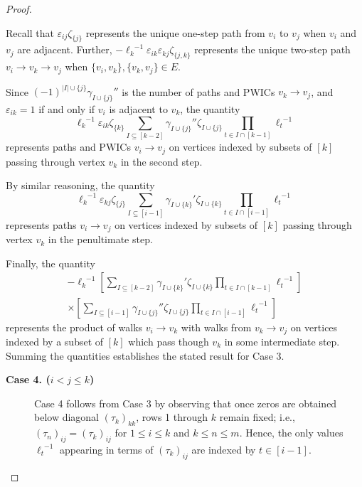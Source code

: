 \documentclass{article}
\theoremstyle{definition}
\numberwithin{equation}{section}
\begin{document}
\begin{proof}
\begin{description}
Recall that $\varepsilon_{ij}\zeta_{\{j\}}$ represents the unique one-step path from $v_i$ to $v_j$ when $v_i$ and $v_j$ are adjacent.  Further, $-{\ell_k}^{-1}\varepsilon_{ik}\varepsilon_{kj}\zeta_{\{j,k\}}$ represents the unique two-step path $v_i\to v_k\to v_j$ when $\{v_i,v_k\}, \{v_k,v_j\}\in E$.  

Since $(-1)^{|I|\cup\{j\}}{\gamma_{I\cup\{j\}}}''$ is the number of paths and PWICs $v_k\to v_j$, and $\varepsilon_{ik}=1$ if and only if $v_i$ is adjacent to $v_k$, the quantity \begin{equation*}
{\ell_k}^{-1}\varepsilon_{ik}\zeta_{\{k\}}\sum_{I\subseteq [k-2]}{\gamma_{I\cup\{j\}}}''\zeta_{I\cup\{j\}}\prod_{t\in I\cap[k-1]}{\ell_t}^{-1}
\end{equation*}
represents paths and PWICs $v_i\to v_j$ on vertices indexed by subsets of $[k]$ passing through vertex $v_k$ in the second step.

By similar reasoning, the quantity \begin{equation*}
{\ell_k}^{-1}\varepsilon_{kj}\zeta_{\{j\}}\sum_{I\subseteq [i-1]}{\gamma_{I\cup\{k\}}}'\zeta_{I\cup\{k\}}\prod_{t\in I\cap[i-1]}{\ell_t}^{-1}\end{equation*}
represents paths $v_i\to v_j$ on vertices indexed by subsets of $[k]$ passing through vertex $v_k$ in the penultimate step.

Finally, the quantity 
\begin{align*}
-{\ell_k}^{-1}\left[\sum_{I\subseteq [k-2]}{\gamma_{I\cup\{k\}}}'\zeta_{I\cup\{k\}}\prod_{t\in I\cap[k-1]}{\ell_t}^{-1}\right]\\
\times\left[\sum_{I\subseteq [i-1]}{\gamma_{I\cup\{j\}}}''\zeta_{I\cup\{j\}}\prod_{t\in I\cap[i-1]}{\ell_t}^{-1}\right]
\end{align*}
represents the product of walks $v_i\to v_k$ with walks from $v_k\to v_j$ on vertices indexed by a subset of $[k]$ which pass though $v_k$ in some intermediate step.  Summing the quantities establishes the stated result for Case 3.
\end{description}

\begin{description}
\item [{\bf Case 4. ($i<j\le k$)}]
Case 4 follows from Case 3 by observing that once zeros are obtained below diagonal $(\tau_k)_{kk}$, rows 1 through $k$ remain fixed; i.e., $(\tau_n)_{ij}=(\tau_k)_{ij}$ for $1\le i\le k$ and $k\le n\le m$.   Hence, the only values ${\ell_t}^{-1}$ appearing in terms of $(\tau_k)_{ij}$ are indexed by $t\in [i-1]$. 
\end{description}


\end{proof}
\end{document}
